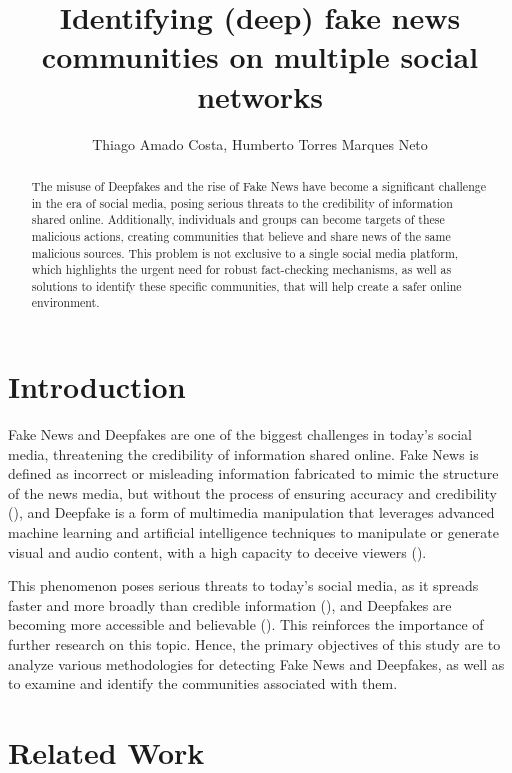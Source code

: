 \documentclass[12pt]{article}
\title{Identifying (deep) fake news communities on multiple social networks}
\author{Thiago Amado Costa\inst{1}, Humberto Torres Marques Neto\inst{1}}
\begin{document}
 

\maketitle

\begin{abstract}
  The misuse of Deepfakes and the rise of Fake News have become a significant challenge in the
  era of social media, posing serious threats to the credibility of information shared online.
  Additionally, individuals and groups can become targets of these malicious actions, creating
  communities that believe and share news of the same malicious sources.
  This problem is not exclusive to a single social media platform, which highlights the urgent
  need for robust fact-checking mechanisms, as well as solutions to identify these specific
  communities, that will help create a safer online environment.
\end{abstract}

\section{Introduction}

Fake News and Deepfakes are one of the biggest challenges in today's social media, threatening the
credibility of information shared online. 
Fake News is defined as incorrect or misleading information fabricated to mimic the structure of 
the news media, but without the process of ensuring accuracy and credibility (\cite{lazer2018science}),
and Deepfake is a form of multimedia manipulation that leverages advanced machine learning and artificial
intelligence techniques to manipulate or generate visual and audio content, with a high capacity to deceive
viewers (\cite{KIETZMANN2020135}). 

This phenomenon poses serious threats to today's social media, as it spreads faster and more broadly
than credible information (\cite{doi:10.1126/science.aap9559}), and Deepfakes are becoming more
accessible and believable (\cite{KIETZMANN2020135}). This reinforces the importance of further
research on this topic.
Hence, the primary objectives of this study are to analyze various methodologies for detecting 
Fake News and Deepfakes, as well as to examine and identify the communities associated with them.

\section{Related Work}
\end{document}
